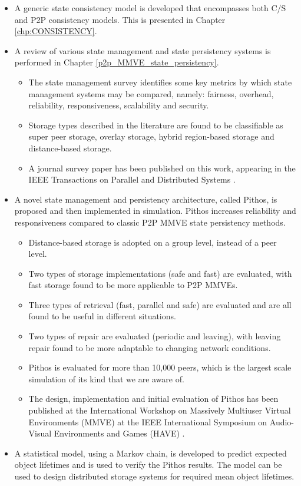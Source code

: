 \begin{itemize}
\item A generic state consistency model is developed that encompasses both C/S and P2P consistency models. This is presented in Chapter \ref{chp:CONSISTENCY}.

\item A review of various state management and state persistency systems is performed in Chapter \ref{p2p_MMVE_state_persistency}.
    \begin{itemize}
    \item The state management survey identifies some key metrics by which state management systems may be compared, namely: fairness, overhead, reliability, responsiveness, scalability and security.
    \item Storage types described in the literature are found to be classifiable as super peer storage, overlay storage, hybrid region-based storage and distance-based storage.
    \item A journal survey paper has been published on this work, appearing in the IEEE Transactions on Parallel and Distributed Systems \cite{gilmore_p2p_mmog_state_persistency}.
    \end{itemize}

\item A novel state management and persistency architecture, called Pithos, is proposed and then implemented in simulation. Pithos increases reliability and responsiveness compared to classic P2P MMVE state persistency methods.
    \begin{itemize}
    \item Distance-based storage is adopted on a group level, instead of a peer level.
    \item Two types of storage implementations (safe and fast) are evaluated, with fast storage found to be more applicable to P2P MMVEs.
    \item Three types of retrieval (fast, parallel and safe) are evaluated and are all found to be useful in different situations.
    \item Two types of repair are evaluated (periodic and leaving), with leaving repair found to be more adaptable to changing network conditions.
    \item Pithos is evaluated for more than 10,000 peers, which is the largest scale simulation of its kind that we are aware of.
    \item The design, implementation and initial evaluation of Pithos has been published at the International Workshop on Massively Multiuser Virtual Environments (MMVE) at the IEEE International Symposium on Audio-Visual Environments and Games (HAVE) \cite{Pithos_mmve_2011}.
    \end{itemize}

\item A statistical model, using a Markov chain, is developed to predict expected object lifetimes and is used to verify the Pithos results. The model can be used to design distributed storage systems for required mean object lifetimes.
\end{itemize}

